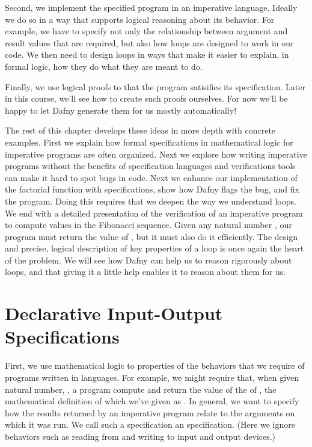 \documentclass[letterpaper,10pt,english]{sphinxmanual}
\begin{document}
Second, we implement the specified program in an imperative language.
Ideally we do so in a way that supports logical reasoning about its
behavior. For example, we have to specify not only the relationship
between argument and result values that are required, but also how
loops are designed to work in our code. We then need to design loops
in ways that make it easier to explain, in formal logic, how they do
what they are meant to do.

Finally, we use logical proofs to  that the program satisifies
its specification. Later in this course, we’ll see how to create such
proofs ourselves. For now we’ll be happy to let Dafny generate them
for us mostly automatically!

The rest of this chapter develops these ideas in more depth with
concrete examples.  First we explain how formal specifications in
mathematical logic for imperative programs are often organized. Next
we explore how writing imperative programs without the benefits of
specification languages and verifications tools can make it hard to
spot bugs in code. Next we enhance our implementation of the factorial
function with specifications, show how Dafny flags the bug, and fix
the program. Doing this requires that we deepen the way we understand
loops. We end with a detailed presentation of the verification of an
imperative program to compute values in the Fibonacci sequence. Given
any natural number , our program must return the value of ,
but it must also do it efficiently.  The design and precise, logical
description of key properties of a loop is once again the heart of the
problem.  We will see how Dafny can help us to reason rigorously about
loops, and that giving it a little help enables it to reason about
them for us.


\section{Declarative Input-Output Specifications}
\label{\detokenize{05-verifying-logical-specifications:declarative-input-output-specifications}}
First, we use mathematical logic to  properties
of the behaviors that we require of programs written in 
languages. For example, we might require that, when given 
natural number, , a program compute and return the value of the
 of , the mathematical definition of which we’ve given
as .  In general, we want to specify how the results returned
by an imperative program relate to the arguments on which it was run.
We call such a specification an  specification. (Here
we ignore  behaviors such as reading from and writing
to input and output devices.)
\end{document}
